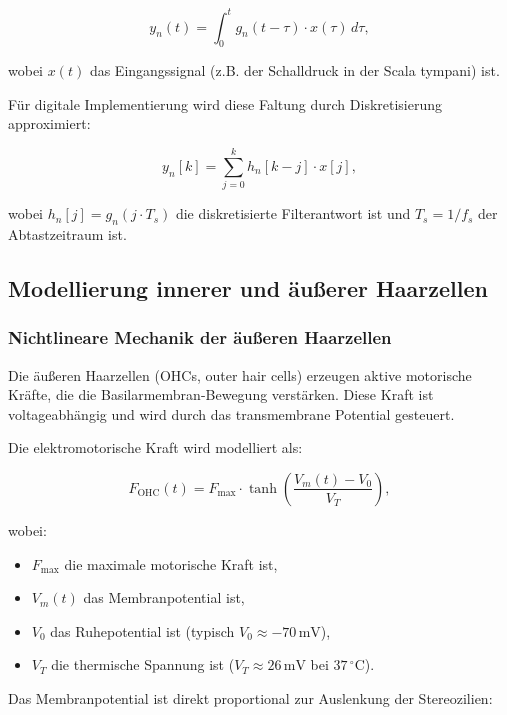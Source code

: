 ﻿\documentclass[12pt, a4paper]{article}
\theoremstyle{definition}
\theoremstyle{remark}
\begin{document}
\begin{equation}
\label{eq:filterbank_output}
y_n(t) = \int_0^t g_n(t - \tau) \cdot x(\tau) \, d\tau,
\end{equation}

wobei $x(t)$ das Eingangssignal (z.B. der Schalldruck in der Scala tympani) 
ist.

Für digitale Implementierung wird diese Faltung durch Diskretisierung 
approximiert:

\begin{equation}
\label{eq:filterbank_digital}
y_n[k] = \sum_{j=0}^{k} h_n[k-j] \cdot x[j],
\end{equation}

wobei $h_n[j] = g_n(j \cdot T_s)$ die diskretisierte Filterantwort ist und 
$T_s = 1/f_s$ der Abtastzeitraum ist.

\subsection{Modellierung innerer und äußerer Haarzellen}

\subsubsection{Nichtlineare Mechanik der äußeren Haarzellen}

Die äußeren Haarzellen (OHCs, outer hair cells) erzeugen aktive motorische 
Kräfte, die die Basilarmembran-Bewegung verstärken. Diese Kraft ist 
voltageabhängig und wird durch das transmembrane Potential gesteuert.

Die elektromotorische Kraft wird modelliert als:

\begin{equation}
\label{eq:ohc_force}
F_{\mathrm{OHC}}(t) = F_{\max} \cdot \tanh\left( \frac{V_m(t) - V_0}{V_T} \right),
\end{equation}

wobei:
\begin{itemize}
\item $F_{\max}$ die maximale motorische Kraft ist,
\item $V_m(t)$ das Membranpotential ist,
\item $V_0$ das Ruhepotential ist (typisch $V_0 \approx -70\,\mathrm{mV}$),
\item $V_T$ die thermische Spannung ist ($V_T \approx 26\,\mathrm{mV}$ bei $37\,^\circ\mathrm{C}$).
\end{itemize}

Das Membranpotential ist direkt proportional zur Auslenkung der Stereozilien:
\end{document}

